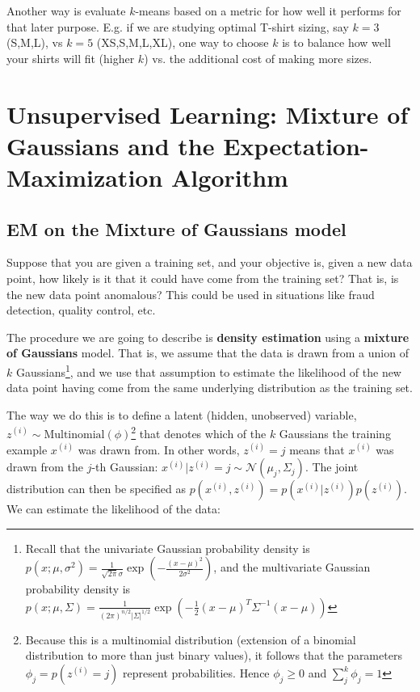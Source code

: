 \documentclass[letterpaper,10pt]{article}
\begin{document}
Another way is evaluate $k$-means based on a metric for how well it performs for that later purpose. E.g. if we are studying optimal T-shirt sizing, say $k=3$ (S,M,L), vs $k=5$ (XS,S,M,L,XL), one way to choose $k$ is to balance how well your shirts will fit (higher $k$) vs. the additional cost of making more sizes.


\section{Unsupervised Learning: Mixture of Gaussians and the Expectation-Maximization Algorithm}

\subsection{EM on the Mixture of Gaussians model}

Suppose that you are given a training set, and your objective is, given a new data point, how likely is it that it could have come from the training set? That is, is the new data point anomalous? This could be used in situations like fraud detection, quality control, etc.

The procedure we are going to describe is \textbf{density estimation} using a \textbf{mixture of Gaussians} model. That is, we assume that the data is drawn from a union of $k$ Gaussians\footnote{Recall that the univariate Gaussian probability density is $p(x;\mu,\sigma^2) = \frac{1}{\sqrt{2\pi}\sigma} \exp(-\frac{(x-\mu)^2}{2\sigma^2})$, and the multivariate Gaussian probability density is $p(x; \mu, \Sigma) = \frac{1}{(2\pi)^{n/2} |\Sigma|^{1/2}} \exp \left( -\frac{1}{2} (x-\mu)^T \Sigma^{-1} (x-\mu) \right)$}, and we use that assumption to estimate the likelihood of the new data point having come from the same underlying distribution as the training set.

The way we do this is to define a latent (hidden, unobserved) variable, $z^{(i)} \sim \text{Multinomial}(\phi)$\footnote{Because this is a multinomial distribution (extension of a binomial distribution to more than just binary values), it follows that the parameters $\phi_j = p(z^{(i)} = j)$ represent probabilities. Hence $\phi_j \geq 0$ and $\sum_j^k \phi_j = 1$} that denotes which of the $k$ Gaussians the training example $x^{(i)}$ was drawn from. In other words, $z^{(i)} = j$ means that $x^{(i)}$ was drawn from the $j$-th Gaussian: $x^{(i)} | z^{(i)} = j \sim \mathscr{N}(\mu_j, \Sigma_j)$. The joint distribution can then be specified as $p(x^{(i)}, z^{(i)}) = p(x^{(i)} | z^{(i)}) p(z^{(i)})$. We can estimate the likelihood of the data:
\end{document}
